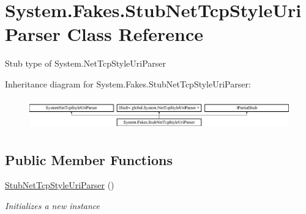 \hypertarget{class_system_1_1_fakes_1_1_stub_net_tcp_style_uri_parser}{\section{System.\-Fakes.\-Stub\-Net\-Tcp\-Style\-Uri\-Parser Class Reference}
\label{class_system_1_1_fakes_1_1_stub_net_tcp_style_uri_parser}
}


Stub type of System.\-Net\-Tcp\-Style\-Uri\-Parser 


Inheritance diagram for System.\-Fakes.\-Stub\-Net\-Tcp\-Style\-Uri\-Parser\-:\begin{figure}[H]
\begin{center}
\leavevmode
\includegraphics[height=1.352657cm]{class_system_1_1_fakes_1_1_stub_net_tcp_style_uri_parser}
\end{center}
\end{figure}
\subsection*{Public Member Functions}
\begin{DoxyCompactItemize}
\item 
\hyperlink{class_system_1_1_fakes_1_1_stub_net_tcp_style_uri_parser_a5058613c4b391ad1ea90541d2dd061c7}{Stub\-Net\-Tcp\-Style\-Uri\-Parser} ()
\begin{DoxyCompactList}\small\item\em Initializes a new instance\end{DoxyCompactList}\end{DoxyCompactItemize}
